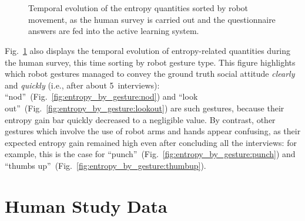 \begin{figure}
\centering
%
 \quad
%
 \\
%
 \quad
%
 \\
%
 \qquad
%
\subfloat
{}
\label{fig:entropy_by_gesture:legend}
%
\caption[Temporal evolution of the entropy quantities sorted by robot movement.]{Temporal evolution of the entropy quantities sorted by robot movement, as the human survey is carried out and the questionnaire answers are fed into the active learning system.}
\label{fig:entropy_by_gesture}
\end{figure}

Fig.~\ref{fig:entropy_by_gesture} also displays the temporal evolution of entropy-related quantities during the human survey, this time sorting by robot gesture type. This figure highlights which robot gestures managed to convey the ground truth social attitude \emph{clearly} and \emph{quickly} (i.e., after about 5~interviews): ``nod''~(Fig.~\ref{fig:entropy_by_gesture:nod}) and ``look out''~(Fig.~\ref{fig:entropy_by_gesture:lookout}) are such gestures, because their entropy gain bar quickly decreased to a negligible value. By contrast, other gestures which involve the use of robot arms and hands appear confusing, as their expected entropy gain remained high even after concluding all the interviews: for example, this is the case for ``punch''~(Fig.~\ref{fig:entropy_by_gesture:punch}) and ``thumbs up''~(Fig.~\ref{fig:entropy_by_gesture:thumbup}).

\section{Human Study Data}
\label{sec:human_study_data}

